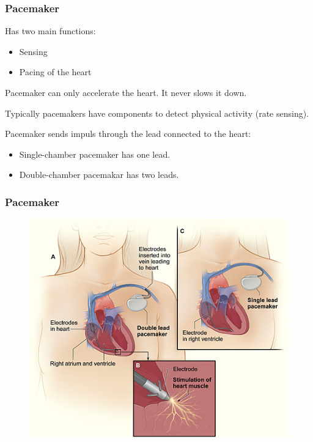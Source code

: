 \documentclass[xcolor=dvipsnames]{beamer}
\begin{document}
  \begin{frame}
    \frametitle{Pacemaker}
    Has two main functions:
    \begin{itemize}
      \item Sensing 
      \item Pacing of the heart
    \end{itemize}

    Pacemaker can only accelerate the heart. It never slows it down. 

    Typically pacemakers have components to detect physical activity (rate sensing). 

    Pacemaker sends impuls through the lead connected to the heart:
    \begin{itemize}
      \item Single-chamber pacemaker has one lead. 
      \item Double-chamber pacemakar has two leads.
    \end{itemize}
  \end{frame}

  \begin{frame}
    \frametitle{Pacemaker}
    \begin{figure}
      \begin{center}
        \includegraphics[width=1 \textwidth]{Figures/pacemaker.png}
      \end{center}
    \end{figure}
  \end{frame}
\end{document}
